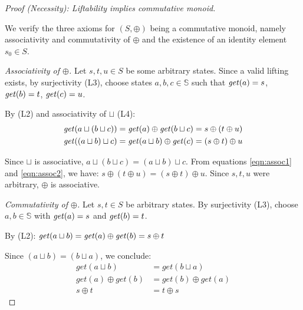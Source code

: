\begin{proof}[Proof (Necessity): Liftability implies commutative monoid]$ $\newline

We verify the three axioms for $(S, \oplus)$ being a commutative monoid, namely associativity and commutativity of $\oplus$ and the existence of an identity element $s_0 \in S$. 


\medskip
\noindent\emph{Associativity of $\oplus$.}
Let $s, t, u \in S$ be some arbitrary states. 
Since a valid lifting exists, by surjectivity (L3), choose states $a, b, c \in \mathbb{S}$ such that $\mathit{get}(a) = s$, $\mathit{get}(b) = t$, $\mathit{get}(c) = u$.


By (L2) and associativity of $\sqcup$ (L4):
\begin{align}
\mathit{get}(a \sqcup (b \sqcup c)) &= \mathit{get}(a) \oplus \mathit{get}(b \sqcup c) = s \oplus (t \oplus u) \label{eqn:assoc1}\\ 
\mathit{get}((a \sqcup b) \sqcup c) &= \mathit{get}(a \sqcup b) \oplus \mathit{get}(c) = (s \oplus t) \oplus u \label{eqn:assoc2}
\end{align}

Since $\sqcup$ is associative, $a \sqcup (b \sqcup c) = (a \sqcup b) \sqcup c$. 
From equations \ref{eqn:assoc1} and \ref{eqn:assoc2}, we have: $s \oplus (t \oplus u) = (s \oplus t) \oplus u$. 
Since $s, t, u$ were arbitrary, $\oplus$ is associative.


\medskip
\noindent\emph{Commutativity of $\oplus$.}
Let $s, t \in S$ be arbitrary states. By surjectivity (L3), choose $a, b \in \mathbb{S}$ with $\mathit{get}(a) = s$ and $\mathit{get}(b) = t$.

By (L2): $\mathit{get}(a \sqcup b) = \mathit{get}(a) \oplus \mathit{get}(b) = s \oplus t$



Since $(a \sqcup b) = (b \sqcup a)$, we conclude:
\begin{align*}
 get(a \sqcup b) & = get(b \sqcup a) \\ 
 get(a) \oplus get(b) & = get(b) \oplus get(a) \\
 s \oplus t & = t \oplus s 
\end{align*}


\end{proof}
